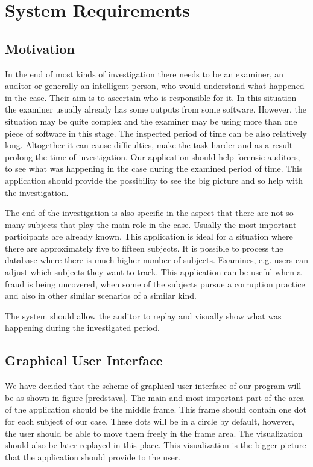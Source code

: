 \chapter{System Requirements} \label{Requirements}

\section{Motivation} In the end of most kinds of investigation there needs to be an examiner, an auditor or generally an intelligent person, who would understand what happened in the case. 
Their aim is to ascertain who is responsible for it. In this situation the examiner usually already has some outputs from some software. However, the situation may be quite complex and the examiner may be using more than one piece of software in this stage. The inspected period of time can be also relatively long. Altogether it can cause difficulties, make the task harder and as a result prolong the time of investigation. Our application should help forensic auditors, to see what was happening in the case during the examined period of time. This application should provide the possibility to see the big picture and so help with the investigation.

The end of the investigation is also specific in the aspect that there are not so many subjects that play the main role in the case. Usually the most important participants are already known. This application is ideal for a situation where there are approximately  five to fifteen subjects. It is possible to process the database where there is much higher number of subjects. Examines, e.g. users can adjust which subjects they want to track. This application can be useful when a fraud is being uncovered, when some of the subjects pursue a corruption practice and also in other similar scenarios of a similar kind. 

The system should allow the auditor to replay and visually show what was happening during the investigated period. 

\section{Graphical User Interface}

We have decided that the scheme of graphical user interface of our program will be as shown in figure \ref{predstava}. The main and most important part of the area of the application should be the middle frame. This frame should contain one dot for each subject of our case. These dots will be in a circle by default, however, the user should be able to move them freely in the frame area. The visualization should also be later replayed in this place. This visualization is the bigger picture that the application should provide to the user. 

